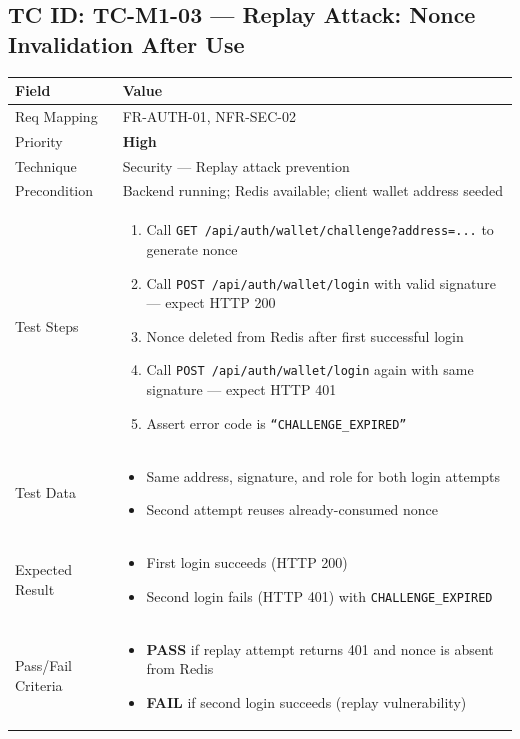 \documentclass[12pt,a4paper]{article}
\newcommand{\sevhigh}{\textcolor{severityhigh}{\textbf{High}}}
\newcommand{\passresult}{\textcolor{passgreen}{\textbf{PASS}}}
\newcommand{\failresult}{\textcolor{failred}{\textbf{FAIL}}}
\begin{document}
\vspace{0.8cm}

\subsection{TC ID: TC-M1-03 --- Replay Attack: Nonce Invalidation After Use}

\begin{tabular}{|p{}|p{}|}
\hline
\rowcolor{lightblue} \textbf{Field} & \textbf{Value} \\
\hline
Req Mapping & FR-AUTH-01, NFR-SEC-02 \\
\hline
Priority & \sevhigh \\
\hline
Technique & Security --- Replay attack prevention \\
\hline
Precondition & Backend running; Redis available; client wallet address seeded \\
\hline
Test Steps &
\begin{enumerate}[nosep, leftmargin=*]
  \item Call \texttt{GET /api/auth/wallet/challenge?address=...} to generate nonce
  \item Call \texttt{POST /api/auth/wallet/login} with valid signature --- expect HTTP 200
  \item Nonce deleted from Redis after first successful login
  \item Call \texttt{POST /api/auth/wallet/login} again with same signature --- expect HTTP 401
  \item Assert error code is \texttt{``CHALLENGE\_EXPIRED''}
\end{enumerate} \\
\hline
Test Data &
\begin{itemize}[nosep, leftmargin=*]
  \item Same address, signature, and role for both login attempts
  \item Second attempt reuses already-consumed nonce
\end{itemize} \\
\hline
Expected Result &
\begin{itemize}[nosep, leftmargin=*]
  \item First login succeeds (HTTP 200)
  \item Second login fails (HTTP 401) with \texttt{CHALLENGE\_EXPIRED}
\end{itemize} \\
\hline
Pass/Fail Criteria &
\begin{itemize}[nosep, leftmargin=*]
  \item \passresult{} if replay attempt returns 401 and nonce is absent from Redis
  \item \failresult{} if second login succeeds (replay vulnerability)
\end{itemize} \\
\hline
\end{tabular}
\end{document}

